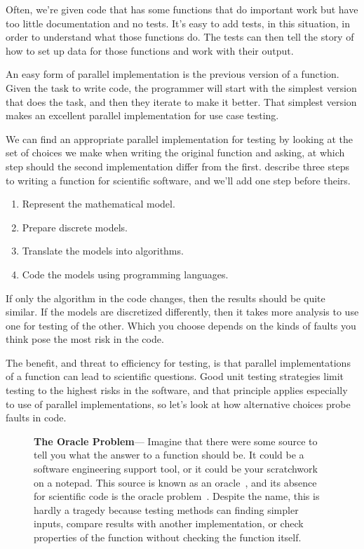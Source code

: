 \documentclass[fleqn,10pt]{olplainarticle}
\newenvironment{callout}
{
\begin{figure}
\begin{center}
\begin{minipage}{0.9\textwidth}
\begin{framed}
}
{
\end{framed}
\end{minipage}
\end{center}
\end{figure}
}
\begin{document}
Often, we're given code that has some functions that do important
work but have too little documentation and no tests. It's easy
to add tests, in this situation, in order to understand what
those functions do. The tests can then tell the story of how
to set up data for those functions and work with their output.

An easy form of parallel implementation is the previous version
of a function. Given the task to write code, the programmer will
start with the simplest version that does the task, and then they
iterate to make it better. That simplest version makes an excellent
parallel implementation for use case testing.

We can find an appropriate parallel implementation for testing by
looking at the set of choices we make when writing the original function
and asking, at which step should the second implementation differ
from the first.
\cite{dahlgren2005} describe three steps to writing a function for
scientific software, and we'll add one step before theirs.
\begin{enumerate}
  \item Represent the mathematical model.
  \item Prepare discrete models.
  \item Translate the models into algorithms.
  \item Code the models using programming languages.
\end{enumerate}
If only the algorithm in the code changes, then the results
should be quite similar. If the models are discretized differently,
then it takes more analysis to use one for testing of the other.
Which you choose depends on the kinds of faults you think pose
the most risk in the code.

The benefit, and threat to efficiency for testing, is that
parallel implementations of a function can lead to scientific
questions. Good unit testing strategies limit testing to the
highest risks in the software, and that principle applies
especially to use of parallel implementations, so let's
look at how alternative choices probe faults in code.

\begin{callout}
\textbf{The Oracle Problem}---
Imagine that there were some source to tell you what the answer to a function
should be. It could be a software engineering support tool, or it could
be your scratchwork on a notepad. This source is known as an
oracle~\citep{howden1986functional}, and its absence for scientific code
is the oracle problem~\citep{sirer1999using}. Despite the name, this
is hardly a tragedy because testing methods can 
finding simpler inputs, compare results with another implementation,
or check properties of the function without checking the function itself.
\end{callout}
\end{document}
